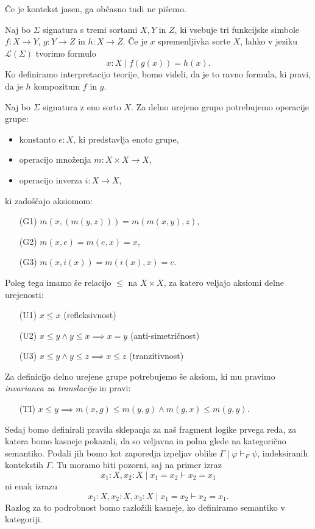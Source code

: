 \documentclass[../kategoricna_logika.tex]{subfiles}
\begin{document}
Če je kontekst jasen, ga občasno tudi ne pišemo.
\begin{primer}\label{primer:kompozitum}
  Naj bo $\Sigma$ signatura s tremi sortami $X,Y$ in $Z$, ki
  vsebuje tri funkcijske simbole $f: X \to Y$, $g : Y \to Z$ in
  $h : X \to Z$.  Če je $x$ spremenljivka sorte $X$, lahko v
  jeziku $\mathcal{L}(\Sigma)$ tvorimo formulo
  $$x:X \mid f(g(x)) = h(x).$$
  Ko definiramo interpretacijo teorije, bomo videli, da je to
  ravno formula, ki pravi, da je $h$ kompozitum $f$ in $g$.
\end{primer}
\begin{primer}\label{primer:delno-urejene-grupe}
  Naj bo $\Sigma$ signatura z eno sorto $X$. Za delno
  urejeno grupo potrebujemo operacije grupe:
  \begin{itemize}
  \item konstanto $e : X$, ki predstavlja enoto grupe,
  \item operacijo množenja $m : X \times X \to X$,
  \item operacijo inverza $i : X \to X$,
  \end{itemize}
  ki zadoščajo aksiomom:
  \begin{itemize}
  \item[(G1)] $m(x,(m(y,z))) = m(m(x,y), z)$,
  \item[(G2)] $m(x,e) = m(e,x) = x$,
  \item[(G3)] $m(x,i(x)) = m(i(x), x) = e$.
  \end{itemize}
  Poleg tega imamo še relacijo $\leq$ na $X \times X$, za katero
  veljajo aksiomi delne urejenosti:
  \begin{itemize}
  \item[(U1)] $x \leq x$ (refleksivnost)
  \item[(U2)] $x \leq y \wedge y \leq x \implies x = y$
    (anti-simetričnost)
  \item[(U3)] $x \leq y \wedge y \leq z \implies x \leq z$
    (tranzitivnost)
  \end{itemize}
  Za definicijo delno urejene grupe potrebujemo še aksiom, ki mu
  pravimo {\emph{invarianca za translacijo}} in pravi:
  \begin{itemize}
  \item[(TI)]
    $x \leq y \implies m(x, g) \leq m(y, g) \wedge m(g,x) \leq
    m(g,y)$.
  \end{itemize}
\end{primer}

Sedaj bomo definirali pravila sklepanja za naš fragment logike prvega
reda, za katera bomo kasneje pokazali, da so veljavna in polna glede
na kategorično semantiko.  Podali jih bomo kot
zaporedja izpeljav oblike $\Gamma \mid \varphi \vdash_F \psi$,
indeksiranih kontekstih $\Gamma$.
Tu moramo biti pozorni, saj na primer izraz
\[x_1:X,x_2:X \mid x_1 = x_2 \vdash x_2 = x_1\] ni enak izrazu
\[x_1:X,x_2:X,x_3:X \mid x_1 = x_2 \vdash x_2 = x_1.\] Razlog za to
podrobnost bomo razložili kasneje, ko definiramo semantiko v
kategoriji.
\end{document}
